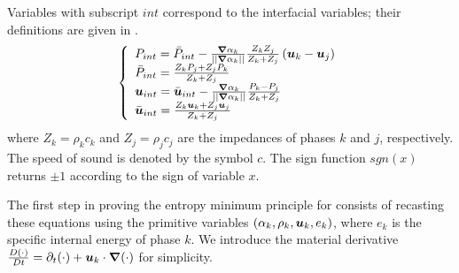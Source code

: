 \begin{appendices}
Variables with subscript ${int}$ correspond to the interfacial variables; their definitions are given in . 
\begin{equation}
\label{eq:sev_equ2-app}
\left\{
\begin{array}{lll}
P_{int} = \bar{P}_{int} - \frac{\boldsymbol\nabla \alpha_k}{|| \boldsymbol\nabla \alpha_k ||} \frac{Z_k Z_j}{Z_k + Z_j} \left( \boldsymbol u_k-\boldsymbol u_j \right) \\
\bar{P}_{int} = \frac{Z_k P_j + Z_j P_k}{Z_k + Z_j} \\
\boldsymbol u_{int} = \bar{\boldsymbol u}_{int} - \frac{\boldsymbol\nabla \alpha_k}{|| \boldsymbol\nabla \alpha_k ||} \frac{P_k - P_j}{Z_k + Z_j} \\
\bar{\boldsymbol u}_{int} = \frac{Z_k \boldsymbol u _k + Z_j \boldsymbol u_j}{Z_k + Z_j}
\end{array}
\right.
\end{equation}
where $Z_k = \rho_k c_k$ and $Z_j = \rho_j c_j$ are the impedances of phases $k$ and $j$, respectively. The speed of sound is denoted by the symbol $c$. The sign function $sgn(x)$ returns $\pm 1$ according to the sign of variable $x$.

The first step in proving the entropy minimum principle for  
consists of recasting these equations using the primitive variables $(\alpha_k, \rho_k, \boldsymbol u_k, e_k)$, where $e_k$ is the specific internal energy of phase $k$. We introduce the material derivative $\frac{D (\cdot)}{Dt} = \partial_t (\cdot) + \boldsymbol u_k \cdot \boldsymbol\nabla (\cdot)$ for simplicity. 


\end{appendices}
